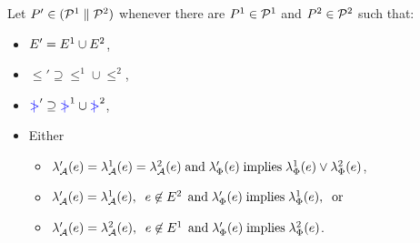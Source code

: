 \begin{definition}
Let $P' \in (\mathcal{P}^1 \parallel \mathcal{P}^2)$
whenever there are $P^1 \in \mathcal{P}^1$ and $P^2 \in \mathcal{P}^2$ such that:
\begin{itemize}
\item $E' = E^1 \cup E^2$,
\item ${\le'}\supseteq{\le^1}\cup{\le^2}$, %
\item ${\gtN'}\supseteq{\gtN^1}\cup{\gtN^2}$, %
\item Either
  \begin{itemize}
  \item $\lambda_{\mathcal{A}}'(e) = \lambda_{\mathcal{A}}^1(e) = \lambda_{\mathcal{A}}^2(e)
    \;\allowbreak\text{and}\allowbreak\; \lambda_{\Phi}'(e) \; \allowbreak\text{implies}\allowbreak\; \lambda_{\Phi}^1(e) \lor \lambda_{\Phi}^2(e)$,
  \item $\lambda_{\mathcal{A}}'(e) = \lambda_{\mathcal{A}}^1(e),\;\; e \not\in E^2\,
    \;\allowbreak\text{and}\allowbreak\; \lambda_{\Phi}'(e) \; \allowbreak\text{implies}\allowbreak\; \lambda_{\Phi}^1(e),\; \; \allowbreak\text{or}\allowbreak\;$
  \item $\lambda_{\mathcal{A}}'(e) = \lambda_{\mathcal{A}}^2(e),\;\; e \not\in E^1\,
    \;\allowbreak\text{and}\allowbreak\; \lambda_{\Phi}'(e) \; \allowbreak\text{implies}\allowbreak\; \lambda_{\Phi}^2(e)$.
  \end{itemize}
\end{itemize}
\end{definition}
